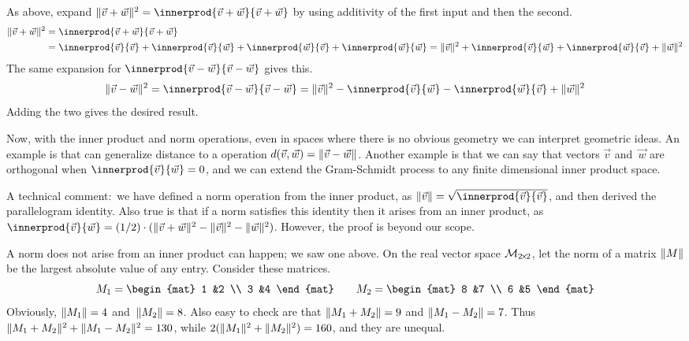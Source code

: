 As above, expand
$
  \norm{\vec{v}+\vec{w}}^2=\innerprod{\vec{v}+\vec{w}}{\vec{v}+\vec{w}}
$
by using additivity of the first input and then the second. 
\begin{align*}
  \norm{\vec{v}+\vec{w}}^2
  &=\innerprod{\vec{v}+\vec{w}}{\vec{v}+\vec{w}}           \\
  &=\innerprod{\vec{v}}{\vec{v}}            
   +\innerprod{\vec{v}}{\vec{w}}
   +\innerprod{\vec{w}}{\vec{v}}
   +\innerprod{\vec{w}}{\vec{w}}
  =\norm{\vec{v}}^2            
   +\innerprod{\vec{v}}{\vec{w}}
   +\innerprod{\vec{w}}{\vec{v}}
   +\norm{\vec{w}}^2
\end{align*}
The same expansion for $\innerprod{\vec{v}-\vec{w}}{\vec{v}-\vec{w}}$
gives this.
\begin{equation*}
  \norm{\vec{v}-\vec{w}}^2
  =\innerprod{\vec{v}-\vec{w}}{\vec{v}-\vec{w}}
  =\norm{\vec{v}}^2
   -\innerprod{\vec{v}}{\vec{w}}
   -\innerprod{\vec{w}}{\vec{v}}
   +\norm{\vec{w}}^2
\end{equation*}
Adding the two gives the desired result. 

Now, with the inner product and norm operations, 
even in spaces where there is no obvious geometry
we can interpret geometric ideas. 
An example is that can generalize distance to a
operation
$d(\vec{v},\vec{w})=\lVert\vec{v}-\vec{w}\rVert$.
Another example is that we can say that
vectors $\vec{v}$ and~$\vec{w}$ are orthogonal when 
$\innerprod{\vec{v}}{\vec{w}}=0$,
and we can extend the Gram-Schmidt process
to any finite dimensional inner product space.

A technical comment:~we have defined a norm operation from the inner product, 
as $\norm{\vec{v}}=\sqrt{\smashdp{\innerprod{\vec{v}}{\vec{v}}}}$,
and then derived the parallelogram identity.
Also true is that if a norm satisfies this identity then it
arises from an inner product, as 
$\innerprod{\vec{v}}{\vec{w}}
  =(1/2)\cdot(\norm{\vec{v}+\vec{w}}^2-\norm{\vec{v}}^2-\norm{\vec{w}}^2)$.
However, the proof is beyond our scope.

A norm does not arise from an inner product can happen;
we saw one above.
On the real vector space $\mathcal{M}_{2 \! \times \! 2}$, let the
norm of a matrix $\lVert M\rVert$ be the largest absolute value of any entry.
Consider these matrices.
\begin{equation*}
  M_1=
  \begin{mat}
  1  &2 \\
  3  &4  
  \end{mat}
  \qquad
  M_2=
  \begin{mat}
  8  &7  \\
  6  &5
  \end{mat}
\end{equation*}
Obviously, $\lVert M_1\rVert=4$ and~$\lVert M_2\rVert=8$.
Also easy to check are that $\lVert M_1+M_2\rVert=9$
and $\lVert M_1-M_2\rVert=7$.
Thus $\lVert M_1+M_2\rVert^2+\lVert M_1-M_2\rVert^2=130$, 
while $2(\lVert M_1\rVert^2+\lVert M_2\rVert^2)=160$,
and they are unequal.

